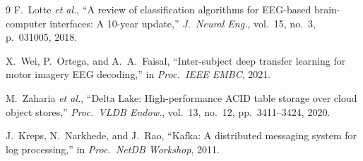 \documentclass[conference]{IEEEtran}
\begin{document}
\begin{thebibliography}{9}
F.~Lotte \emph{et al.},
``A review of classification algorithms for EEG-based brain-computer
interfaces: A 10-year update,''
\emph{J.\ Neural Eng.}, vol.~15, no.~3, p.~031005, 2018.

X.~Wei, P.~Ortega, and A.~A.~Faisal,
``Inter-subject deep transfer learning for motor imagery EEG decoding,''
in \emph{Proc.\ IEEE EMBC}, 2021.

M.~Zaharia \emph{et al.},
``Delta Lake: High-performance ACID table storage over cloud object
stores,''
\emph{Proc.\ VLDB Endow.}, vol.~13, no.~12, pp.~3411--3424, 2020.

J.~Kreps, N.~Narkhede, and J.~Rao,
``Kafka: A distributed messaging system for log processing,''
in \emph{Proc.\ NetDB Workshop}, 2011.

\end{thebibliography}
\end{document}

